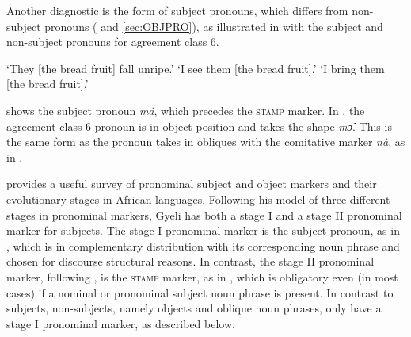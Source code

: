Another diagnostic is the form of subject pronouns, which differs from non-subject pronouns ( and \ref{sec:OBJPRO}), as illustrated in  with the subject and non-subject pronouns for agreement class 6.


\ea \label{SBJSCOP}
    \trans `They [the bread fruit] fall unripe.'
    \trans `I see them [the bread fruit].'
    \trans `I bring them [the bread fruit].'
\z
\z

\noindent {} shows the subject pronoun {\itshape má},  which precedes the \textsc{stamp} marker. In , the agreement class 6 pronoun is in object position and takes the shape {\itshape mɔ̂}. This is the same form as the pronoun takes in obliques with the comitative marker {\itshape nà}, as in .

\citet{creissels2005} provides a useful survey of pronominal subject and object markers and their evolutionary stages in African languages. Following his model of three different stages in pronominal markers, Gyeli has both a stage I and a stage II pronominal marker for subjects. The stage I pronominal marker is the subject pronoun, as in , which is in complementary distribution with its corresponding noun phrase and chosen for discourse structural reasons. In contrast, the stage II pronominal marker, following \citet{creissels2005}, is the \textsc{stamp} marker, as in , which is obligatory even (in most cases) if a nominal or pronominal subject noun phrase is present. In contrast to subjects, non-subjects, namely objects and oblique noun phrases, only have a stage I pronominal marker, as described below. 









